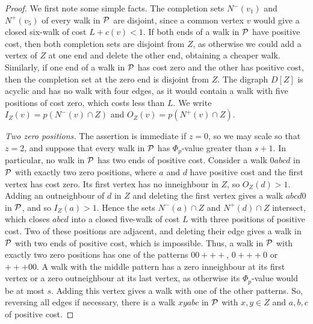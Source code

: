 \begin{proof}
We first note some simple facts. The completion sets $N^-(v_1)$ and $N^+(v_5)$ of every walk in $\mathcal P$ are disjoint, since
a common vertex $v$ would give a closed six-walk of cost $L+c(v)<1$.
If both ends of a walk in $\mathcal P$ have positive cost, then both completion sets are disjoint from $Z$, as otherwise we could add a vertex of $Z$ at one end and delete the other end, obtaining a cheaper walk. Similarly, if one end of a walk in $\mathcal P$ has cost zero and the other has positive cost, then the completion set at the zero end is disjoint from $Z$.
The digraph $D[Z]$ is acyclic and has no walk with four edges, as it would contain a walk with five positions of cost zero, which costs less than $L$.
We write $I_Z(v)=p(N^-(v)\cap Z)$ and $O_Z(v)=p(N^+(v)\cap Z)$.

\emph{Two zero positions.}
The assertion is immediate if $z=0$, so we may scale so that $z=2$, and suppose that every walk in $\mathcal P$ has $\Phi_p$-value greater than $s+1$.
In particular, no walk in $\mathcal P$ has two ends of positive cost.
Consider a walk $0abcd$ in $\mathcal P$ with exactly two zero positions, where $a$ and $d$ have positive cost and the first vertex has cost zero. Its first vertex has no inneighbour in $Z$, so $O_Z(d)>1$.
Adding an outneighbour of $d$ in $Z$ and deleting the first vertex gives a walk $abcd0$ in $\mathcal P$, and so $I_Z(a)>1$.
Hence the sets $N^-(a)\cap Z$ and $N^+(d)\cap Z$ intersect, which closes $abcd$ into a closed five-walk of cost $L$ with three positions of positive cost. Two of these positions are adjacent, and deleting their edge gives a walk in $\mathcal P$ with two ends of positive cost, which is impossible.
Thus, a walk in $\mathcal P$ with exactly two zero positions has one of the patterns $00{+}{+}{+}$, $0{+}{+}{+}0$ or ${+}{+}{+}00$.
A walk with the middle pattern has a zero inneighbour at its first vertex or a zero outneighbour at its last vertex, as otherwise its $\Phi_p$-value would be at most $s$. Adding this vertex gives a walk with one of the other patterns. So, reversing all edges if necessary, there is a walk $xyabc$ in $\mathcal P$ with $x,y\in Z$ and $a,b,c$ of positive cost.


\end{proof}
